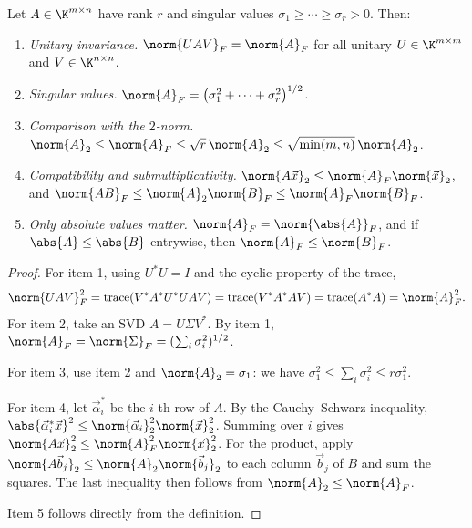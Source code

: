 \begin{proposition}
  \label{prop:frobenius}
  Let $A \in \K^{m \times n}$ have rank $r$ and singular values $\sigma_1 \ge \cdots \ge \sigma_r > 0$. Then:
  \begin{enumerate}
    \item \emph{Unitary invariance.} $\norm{UAV}_F = \norm{A}_F$ for all unitary $U \in \K^{m \times m}$ and $V \in \K^{n \times n}$.
    \item \emph{Singular values.} $\norm{A}_F = \left(\sigma_1^2 + \cdots + \sigma_r^2\right)^{1/2}$.
    \item \emph{Comparison with the $2$-norm.} $\norm{A}_2 \le \norm{A}_F \le \sqrt{r}\,\norm{A}_2 \le \sqrt{\min(m, n)}\,\norm{A}_2$.
    \item \emph{Compatibility and submultiplicativity.} $\norm{A\vec{x}}_2 \le \norm{A}_F\norm{\vec{x}}_2$, and $\norm{AB}_F \le \norm{A}_2\norm{B}_F \le \norm{A}_F\norm{B}_F$.
    \item \emph{Only absolute values matter.} $\norm{A}_F = \norm{\abs{A}}_F$, and if $\abs{A} \le \abs{B}$ entrywise, then $\norm{A}_F \le \norm{B}_F$.
  \end{enumerate}
\end{proposition}

\begin{proof}
  For item 1, using $U^\ast U = I$ and the cyclic property of the trace,
  \begin{equation}
    \norm{UAV}_F^2 = \operatorname{trace}(V^\ast A^\ast U^\ast UAV) = \operatorname{trace}(V^\ast A^\ast AV) = \operatorname{trace}(A^\ast A) = \norm{A}_F^2.
  \end{equation}
  For item 2, take an SVD $A = U\Sigma V^\ast$. By item 1, $\norm{A}_F = \norm{\Sigma}_F = (\sum_i\sigma_i^2)^{1/2}$.

  For item 3, use item 2 and $\norm{A}_2 = \sigma_1$: we have $\sigma_1^2 \le \sum_i\sigma_i^2 \le r\sigma_1^2$.

  For item 4, let $\vec{\alpha}_i^\ast$ be the $i$-th row of $A$. By the Cauchy--Schwarz inequality, $\abs{\vec{\alpha}_i^\ast\vec{x}}^2 \le \norm{\vec{\alpha}_i}_2^2\norm{\vec{x}}_2^2$. Summing over $i$ gives $\norm{A\vec{x}}_2^2 \le \norm{A}_F^2\norm{\vec{x}}_2^2$. For the product, apply $\norm{A\vec{b}_j}_2 \le \norm{A}_2\norm{\vec{b}_j}_2$ to each column $\vec{b}_j$ of $B$ and sum the squares. The last inequality then follows from $\norm{A}_2 \le \norm{A}_F$.

  Item 5 follows directly from the definition.
\end{proof}

